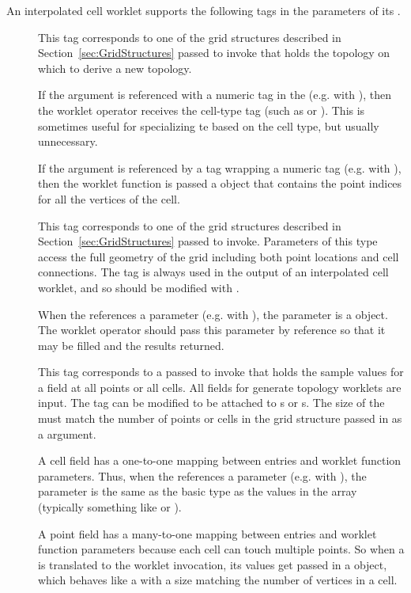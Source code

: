 An interpolated cell worklet supports the following tags in the parameters
of its \controlsignature.
\begin{description}
\item[] This tag corresponds to one of the grid structures
  described in Section~\ref{sec:GridStructures} passed to invoke that holds
  the topology on which to derive a new topology.

  If the  argument is referenced with a numeric tag in the
  \executionsignature (e.g. with ), then the worklet operator
  receives the cell-type tag (such as  or
  ). This is sometimes useful for specializing te  based
  on the cell type, but usually unnecessary.

  If the  argument is referenced by a 
  tag wrapping a numeric tag (e.g. with ), then
  the worklet function is passed a  object that
  contains the point indices for all the vertices of the cell.
\item[] This tag corresponds to one of the grid structures
  described in Section~\ref{sec:GridStructures} passed to
  invoke. Parameters of this type access the full geometry of the grid
  including both point locations and cell connections. The
   tag is always used in the output of an interpolated
  cell worklet, and so should be modified with .

  When the \executionsignature references a \controlsignature
   parameter (e.g. with ), the parameter is a
   object. The worklet operator should pass
  this parameter by reference so that it may be filled and the results
  returned.
\item[] This tag corresponds to a 
  passed to invoke that holds the sample values for a field at all points
  or all cells. All fields for generate topology worklets are input. The
   tag can be modified to be attached to s or
  s. The size of the  must match the
  number of points or cells in the grid structure passed in as a
   argument.

  A cell field has a one-to-one mapping between 
  entries and worklet function parameters. Thus, when the
  \executionsignature references a \controlsignature {}
  parameter (e.g. with ), the parameter is the same as the
  basic type as the values in the array (typically something like
   or ).

  A point field has a many-to-one mapping between 
  entries and worklet function parameters because each cell can touch
  multiple points. So when a  is translated to the
  worklet invocation, its values get passed in a 
  object, which behaves like a  with a size matching the number
  of vertices in a cell.
\end{description}

